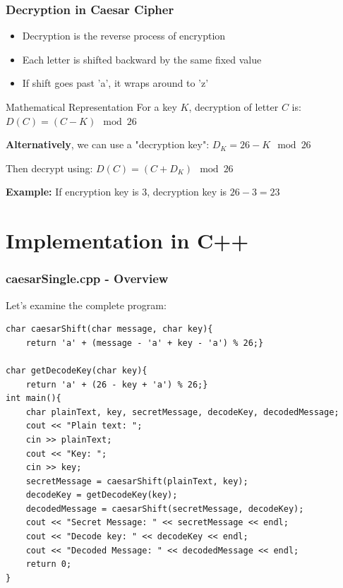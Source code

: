 \documentclass{beamer}
\begin{document}
\begin{frame}
    \frametitle{Decryption in Caesar Cipher}
    \begin{itemize}
        \item Decryption is the reverse process of encryption
        \item Each letter is shifted backward by the same fixed value
        \item If shift goes past 'a', it wraps around to 'z'
    \end{itemize}
    
    \begin{block}{Mathematical Representation}
        For a key $K$, decryption of letter $C$ is:
        $D(C) = (C - K) \mod 26$
        
        \textbf{Alternatively}, we can use a "decryption key":
        $D_K = 26 - K \mod 26$
        
        Then decrypt using: $D(C) = (C + D_K) \mod 26$
    \end{block}
    
    \textbf{Example:} If encryption key is 3, decryption key is $26 - 3 = 23$
\end{frame}

\section{Implementation in C++}

\begin{frame}[fragile]
    \frametitle{caesarSingle.cpp - Overview}
    
    Let's examine the complete program:
    
    \begin{lstlisting}
char caesarShift(char message, char key){
    return 'a' + (message - 'a' + key - 'a') % 26;}

char getDecodeKey(char key){
    return 'a' + (26 - key + 'a') % 26;}
int main(){
    char plainText, key, secretMessage, decodeKey, decodedMessage;
    cout << "Plain text: ";
    cin >> plainText;
    cout << "Key: ";
    cin >> key;
    secretMessage = caesarShift(plainText, key);
    decodeKey = getDecodeKey(key);
    decodedMessage = caesarShift(secretMessage, decodeKey);
    cout << "Secret Message: " << secretMessage << endl;
    cout << "Decode key: " << decodeKey << endl;
    cout << "Decoded Message: " << decodedMessage << endl;
    return 0;
}
    \end{lstlisting}
\end{frame}
\end{document}
